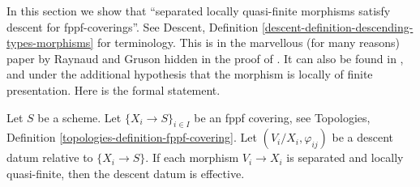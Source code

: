 \noindent
In this section we show that ``separated locally quasi-finite morphisms
satisfy descent for fppf-coverings''. See Descent, Definition
\ref{descent-definition-descending-types-morphisms} for terminology.
This is in the marvellous
(for many reasons) paper by Raynaud and Gruson hidden in the proof
of \cite[Lemma 5.7.1]{GruRay}.
It can also be found in \cite{Murre-representation}, and
\cite[Expos\'e X, Lemma 5.4]{SGA3}
under the additional
hypothesis that the morphism is locally of finite presentation.
Here is the formal statement.

\begin{lemma}
\label{lemma-separated-locally-quasi-finite-morphisms-fppf-descend}
Let $S$ be a scheme.
Let $\{X_i \to S\}_{i\in I}$ be an fppf covering, see
Topologies, Definition \ref{topologies-definition-fppf-covering}.
Let $(V_i/X_i, \varphi_{ij})$ be a descent datum
relative to $\{X_i \to S\}$. If each morphism
$V_i \to X_i$ is separated and locally quasi-finite,
then the descent datum is effective.
\end{lemma}

